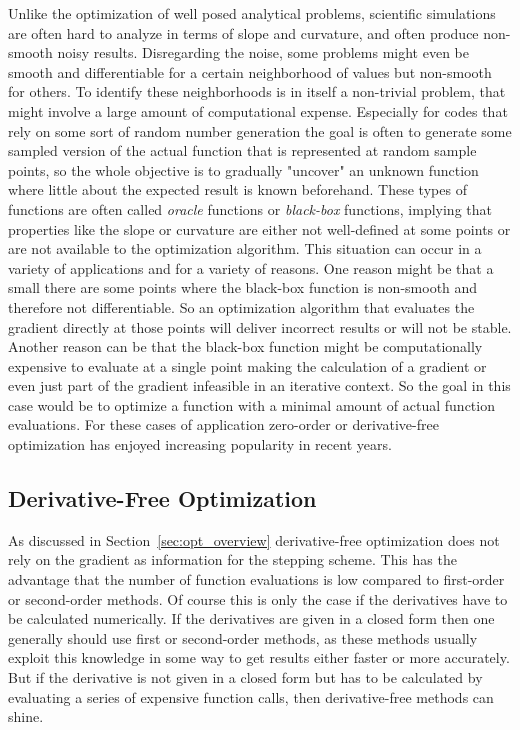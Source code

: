 \documentclass[a4paper,10pt]{article}
\newcommand{\secref}[1]{Section~\ref{#1}}
\begin{document}
    Unlike the optimization of well posed analytical problems, scientific
    simulations are often hard to analyze in terms of slope and 
    curvature, and often produce non-smooth noisy results.
    Disregarding the noise, some problems might even be smooth and
    differentiable for a certain neighborhood of values but non-smooth
    for others.
    To identify these neighborhoods is in itself a non-trivial problem,
    that might involve a large amount of computational expense.
    Especially for codes that rely on some sort of random number generation
    the goal is often to generate some sampled version of the actual function
    that is represented at random sample points, so the whole
    objective is to gradually "uncover" an unknown function where
    little about the expected result is known beforehand.
    These types of functions are often called \emph{oracle} functions
    or \emph{black-box} functions, implying that properties like
    the slope or curvature are either not well-defined at some points
    or are not available to the optimization algorithm.
    This situation can occur in a variety of applications and
    for a variety of reasons.
    One reason might be that a small there are some points where the
    black-box function is non-smooth and therefore not differentiable.
    So an optimization algorithm that evaluates the gradient directly
    at those points will deliver incorrect results or will
    not be stable.
    Another reason can be that the black-box function might be
    computationally expensive to evaluate at a single point making
    the calculation of a gradient or even just part of the gradient
    infeasible in an iterative context.
    So the goal in this case would be to optimize a function with
    a minimal amount of actual function evaluations.
    For these cases of application zero-order or derivative-free 
    optimization has enjoyed increasing popularity in recent years.

    \subsection{Derivative-Free Optimization} \label{sec:derivative_free}

    As discussed in \secref{sec:opt_overview} derivative-free 
    optimization does not rely on the gradient as information for
    the stepping scheme.
    This has the advantage that the number of function evaluations
    is low compared to first-order or second-order methods.
    Of course this is only the case if the derivatives have to be
    calculated numerically.
    If the derivatives are given in a closed form then one generally
    should use first or second-order methods, as these methods
    usually exploit this knowledge in some way to get results
    either faster or more accurately.
    But if the derivative is not given in a closed form but has to be
    calculated by evaluating a series of expensive function calls, then
    derivative-free methods can shine.
\end{document}
